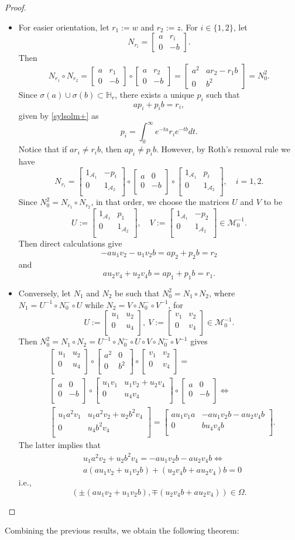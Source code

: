 \documentclass{article}
\theoremstyle{definition}
\def\A{{\mathcal{A}}}
\def\HR{\mathbb{H}_r}
\newcommand{\mat}[4]{\left[\begin{array}{cc}#1 & #2 \\ #3 & #4 \\
	\end{array}\right]}
\begin{document}
\begin{proof}
\begin{itemize}
\item[(a)] For easier orientation, let $r_1:=w$ and $r_2:=z$. For $i\in\{1,2\}$, let
$$N_{r_i}=\left[\begin{array}{cr}a & r_i\\ 0 & -b\end{array}\right].$$
Then 
$$N_{r_1}\circ N_{r_2}=\left[\begin{array}{cr}a & r_1\\ 0 & -b\end{array}\right]\circ \left[\begin{array}{cr}a & r_2\\ 0 & -b\end{array}\right]=\left[\begin{array}{cc}a^2 & ar_2-r_1b\\ 0 & b^2\end{array}\right]=N_0^2.$$
Since $\sigma(a)\cup\sigma(b)\subset\HR$, there exists a unique $p_i$ such that
$$ap_i+p_ib=r_i,$$
given by \eqref{sylsolm+} as
$$p_i=\int_0^\infty e^{-ta}r_ie^{-tb}dt.$$
Notice that if $ar_i\neq r_ib$, then $ap_i\neq p_ib$. However, by Roth's removal rule we have
$$N_{r_i}=\mat{1_{\A_1}}{-p_i}{0}{1_{\A_2}}\circ\mat{a}{0}{0}{-b}\circ\mat{1_{\A_1}}{p_i}{0}{1_{\A_2}},\quad i=1,2.$$
Since $N_0^2=N_{r_1}\circ N_{r_2}$, in that order, we choose the matrices $U$ and $V$ to be
$$U:=\mat{1_{\A_1}}{p_1}{0}{1_{\A_2}},\quad V:=\mat{1_{\A_1}}{-p_2}{0}{1_{\A_2}}\in\mathcal{M}^{-1}_0.$$
Then direct calculations give
$$-au_1v_2-u_1v_2b=ap_2+p_2b=r_2$$
and
$$au_2v_4+u_2v_4b=ap_1+p_1b=r_1.$$
\item[(b)] Conversely, let $N_1$ and $N_2$ be such that $N_0^2=N_1\circ N_2$, where $N_1=U^{-1}\circ N^-_0\circ U$ while $N_2=V\circ N^-_0\circ V^{-1}$, for 
$$U:=\mat{u_1}{u_2}{0}{u_4},\ V:=\mat{v_1}{v_2}{0}{v_4}\in\mathcal{M}_0^{-1}.$$ 
Then $N_0^2=N_1\circ N_2=U^{-1}\circ N^-_0\circ U\circ V\circ N^-_0\circ V^{-1}$ gives
$$\begin{aligned}
&\mat{u_1}{u_2}{0}{u_4}\circ \mat{a^2}{0}{0}{b^2}\circ \mat{v_1}{v_2}{0}{v_4}=\\
&\mat{a}{0}{0}{-b}\circ \mat{u_1v_1}{u_1v_2+u_2v_4}{0}{u_4v_4}\circ \mat{a}{0}{0}{-b}\Leftrightarrow\\
&\mat{u_1a^2v_1}{u_1a^2v_2+u_2b^2v_4}{0}{u_4b^2v_4}=\mat{au_1v_1a}{-au_1v_2b-au_2v_4b}{0}{bu_4v_4b}.
\end{aligned}$$
The latter implies that 
$$\begin{aligned}
&u_1a^2v_2+u_2b^2v_4=-au_1v_2b-au_2v_4b\Leftrightarrow\\
&a(au_1v_2+u_1v_2b)+(u_2v_4b+au_2v_4)b=0\end{aligned}$$
i.e., 
$$\left(\pm\left(au_1v_2+u_1v_2b\right), \mp\left( u_2v_4b+au_2v_4\right)\right)\in\Omega.$$
\end{itemize}
\end{proof}
\noindent Combining the previous results, we obtain the following theorem:
\end{document}
